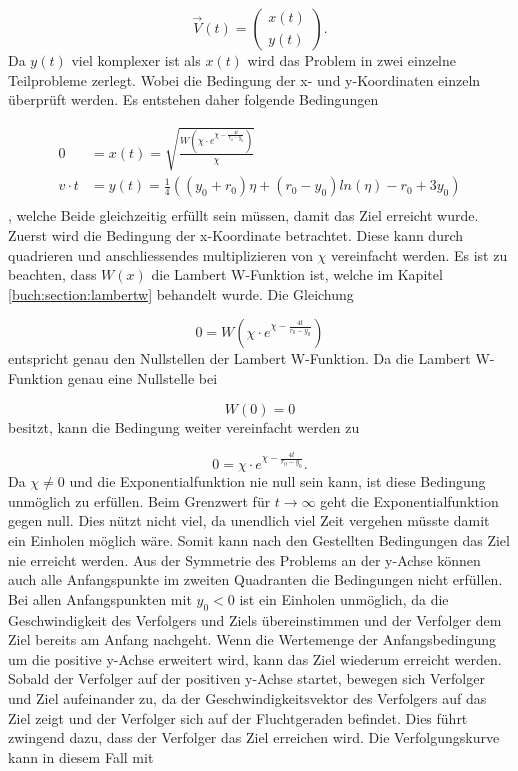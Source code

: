 \begin{equation}
    \vec{V}(t)
    =
    \left( \begin{array}{c} x(t) \\ y(t) \end{array} \right)
    \text{.}
\end{equation}
%
 Da $y(t)$ viel komplexer ist als $x(t)$ wird das Problem in zwei einzelne Teilprobleme zerlegt. Wobei die Bedingung der x- und y-Koordinaten einzeln überprüft werden. Es entstehen daher folgende Bedingungen

\begin{align*}
    0
    &=
    x(t)
    =
    \sqrt{\frac{W\left(\chi\cdot e^{\chi-\frac{4t}{r_0-y_0}}\right)}{\chi}}
    \\
    v \cdot t
    &=
    y(t)
    =
    \frac{1}{4}\left(\left(y_0+r_0\right)\eta+\left(r_0-y_0\right)ln\left(\eta\right)-r_0+3y_0\right)
    \\
\end{align*}
%
, welche Beide gleichzeitig erfüllt sein müssen, damit das Ziel erreicht wurde.
Zuerst wird die Bedingung der x-Koordinate betrachtet.
Diese kann durch quadrieren und anschliessendes multiplizieren von $\chi$ vereinfacht werden.
Es ist zu beachten, dass $W(x)$ die Lambert W-Funktion ist, welche im Kapitel \eqref{buch:section:lambertw} behandelt wurde.
Die Gleichung

\begin{equation}
    0
    =
    W\left(\chi\cdot e^{\chi-\frac{4t}{r_0-y_0}}\right)
\end{equation}
%
entspricht genau den Nullstellen der Lambert W-Funktion. Da die Lambert W-Funktion genau eine Nullstelle bei

\begin{equation*}
    W(0)=0
\end{equation*}
%
besitzt, kann die Bedingung weiter vereinfacht werden zu

\begin{equation}
    0
    =
    \chi\cdot e^{\chi-\frac{4t}{r_0-y_0}}
    \text{.}
\end{equation}
%
Da $\chi\neq0$ und die Exponentialfunktion nie null sein kann, ist diese Bedingung unmöglich zu erfüllen.
Beim Grenzwert für $t\rightarrow\infty$ geht die Exponentialfunktion gegen null.
Dies nützt nicht viel, da unendlich viel Zeit vergehen müsste damit ein Einholen möglich wäre.
Somit kann nach den Gestellten Bedingungen das Ziel nie erreicht werden.
Aus der Symmetrie des Problems an der y-Achse können auch alle Anfangspunkte im zweiten Quadranten die Bedingungen nicht erfüllen.
Bei allen Anfangspunkten mit $y_0<0$ ist ein Einholen unmöglich, da die Geschwindigkeit des Verfolgers und Ziels übereinstimmen und der Verfolger dem Ziel bereits am Anfang nachgeht.
Wenn die Wertemenge der Anfangsbedingung um die positive y-Achse erweitert wird, kann das Ziel wiederum erreicht werden.
Sobald der Verfolger auf der positiven y-Achse startet, bewegen sich Verfolger und Ziel aufeinander zu, da der Geschwindigkeitsvektor des Verfolgers auf das Ziel zeigt und der Verfolger sich auf der Fluchtgeraden befindet.
Dies führt zwingend dazu, dass der Verfolger das Ziel erreichen wird.
Die Verfolgungskurve kann in diesem Fall mit

